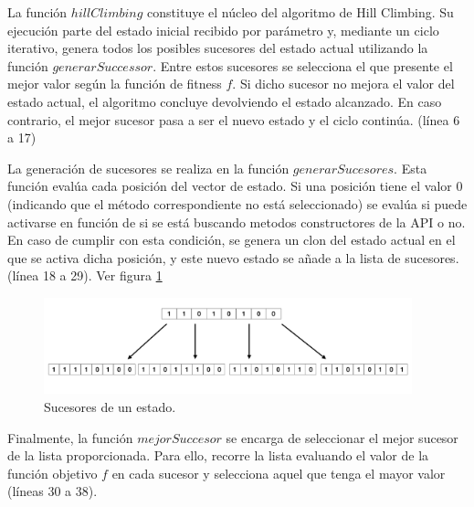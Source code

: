 La función $hillClimbing$ constituye el núcleo del algoritmo de Hill Climbing. Su ejecución parte del estado inicial recibido por parámetro y, 
mediante un ciclo iterativo, genera todos los posibles sucesores del estado actual utilizando la función $generarSuccessor$. 
Entre estos sucesores se selecciona el que presente el mejor valor según la función de fitness $f$. Si dicho sucesor no mejora el valor del estado actual,
el algoritmo concluye devolviendo el estado alcanzado. En caso contrario, el mejor sucesor pasa a ser el nuevo estado y el ciclo continúa. (línea 6 a 17)

La generación de sucesores se realiza en la función $generarSucesores$. Esta función evalúa cada posición del vector de estado. Si una posición tiene el valor 0 
(indicando que el método correspondiente no está seleccionado) se evalúa si puede activarse en función de si se está buscando metodos constructores de la API o no. 
En caso de cumplir con esta condición, se genera un clon del estado actual en el que se activa dicha posición, y este nuevo estado se añade a la lista de sucesores. (línea 18 a 29). Ver figura \ref{fig:succ-hillClimbing}

\begin{figure}[H]
    \centering
    \includegraphics[width=0.95\textwidth]{images/succesores.png}
    \caption{Sucesores de un estado.}
    \label{fig:succ-hillClimbing}
  \end{figure}
  
Finalmente, la función $mejorSuccesor$ se encarga de seleccionar el mejor sucesor de la lista proporcionada.
Para ello, recorre la lista evaluando el valor de la función objetivo $f$ en
cada sucesor y selecciona aquel que tenga el mayor valor (líneas 30 a 38).


%
%


